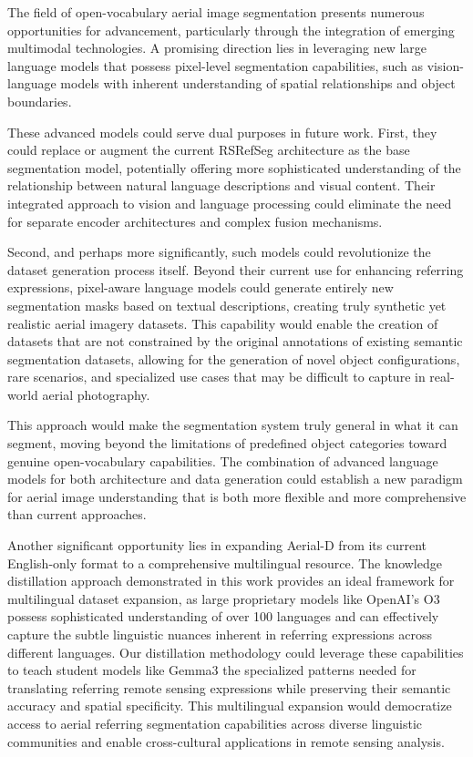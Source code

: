 The field of open-vocabulary aerial image segmentation presents numerous opportunities for advancement, particularly through the integration of emerging multimodal technologies. A promising direction lies in leveraging new large language models that possess pixel-level segmentation capabilities, such as vision-language models with inherent understanding of spatial relationships and object boundaries.

These advanced models could serve dual purposes in future work. First, they could replace or augment the current RSRefSeg architecture as the base segmentation model, potentially offering more sophisticated understanding of the relationship between natural language descriptions and visual content. Their integrated approach to vision and language processing could eliminate the need for separate encoder architectures and complex fusion mechanisms.

Second, and perhaps more significantly, such models could revolutionize the dataset generation process itself. Beyond their current use for enhancing referring expressions, pixel-aware language models could generate entirely new segmentation masks based on textual descriptions, creating truly synthetic yet realistic aerial imagery datasets. This capability would enable the creation of datasets that are not constrained by the original annotations of existing semantic segmentation datasets, allowing for the generation of novel object configurations, rare scenarios, and specialized use cases that may be difficult to capture in real-world aerial photography.

This approach would make the segmentation system truly general in what it can segment, moving beyond the limitations of predefined object categories toward genuine open-vocabulary capabilities. The combination of advanced language models for both architecture and data generation could establish a new paradigm for aerial image understanding that is both more flexible and more comprehensive than current approaches.

Another significant opportunity lies in expanding Aerial-D from its current English-only format to a comprehensive multilingual resource. The knowledge distillation approach demonstrated in this work provides an ideal framework for multilingual dataset expansion, as large proprietary models like OpenAI's O3 possess sophisticated understanding of over 100 languages and can effectively capture the subtle linguistic nuances inherent in referring expressions across different languages. Our distillation methodology could leverage these capabilities to teach student models like Gemma3 the specialized patterns needed for translating referring remote sensing expressions while preserving their semantic accuracy and spatial specificity. This multilingual expansion would democratize access to aerial referring segmentation capabilities across diverse linguistic communities and enable cross-cultural applications in remote sensing analysis.

